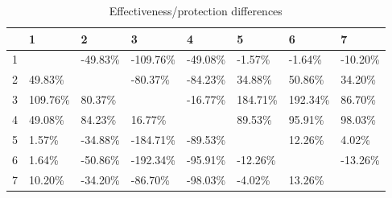\begin{table}[ht]
\centering
\begin{tabular}{rlllllll}
  \hline
 & 1 & 2 & 3 & 4 & 5 & 6 & 7 \\ 
  \hline
1 &  & -49.83\% & -109.76\% & -49.08\% & -1.57\% & -1.64\% & -10.20\% \\ 
  2 & 49.83\% &  & -80.37\% & -84.23\% & 34.88\% & 50.86\% & 34.20\% \\ 
  3 & 109.76\% & 80.37\% &  & -16.77\% & 184.71\% & 192.34\% & 86.70\% \\ 
  4 & 49.08\% & 84.23\% & 16.77\% &  & 89.53\% & 95.91\% & 98.03\% \\ 
  5 & 1.57\% & -34.88\% & -184.71\% & -89.53\% &  & 12.26\% & 4.02\% \\ 
  6 & 1.64\% & -50.86\% & -192.34\% & -95.91\% & -12.26\% &  & -13.26\% \\ 
  7 & 10.20\% & -34.20\% & -86.70\% & -98.03\% & -4.02\% & 13.26\% &  \\ 
   \hline
\end{tabular}
\caption{Effectiveness/protection differences} 
\end{table}

